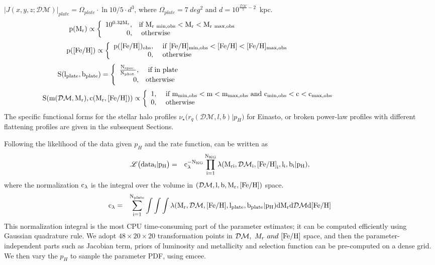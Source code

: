 \documentclass[12pt,preprint]{aastex}
\newcommand{\DM}{\mathcal{DM}}
\newcommand{\feh}{{\rm [Fe/H]}}
\newcommand{\lph}{\mathscr{L}\bigl({data_i}|p_H\bigr)}
\begin{document}
$ |J(x,y,z;\DM)|_{plate} = \Omega_{plate} \cdot \ln10 / 5 \cdot  d^3$,
 where $\Omega_{plate}=7~deg^2$ and $d=10^{\frac{\DM}{5}-2}$~kpc.
\begin{eqnarray}
\rm p(M_r) \propto \left\{ \begin{array}{rl}
\rm 10^{0.32M_r}, &\mbox{\rm if $\rm M_{r~min,obs}<M_r<M_{r~max,obs}$} ~~~~~~~~~~~~~~~~~~~~~~~~~~~~~~~~~~~~~~~~~~~~~~~~~~~~~~~\\
0, &\mbox{ \rm otherwise}~~~~~~~~~~~~~~~~~~~~~~~~~~~~~~~~~~~~~~~~~~~~~~~~~~~~~~~~~~~~~~~~~~~~~~~~~~~~~~~~~~~~
\end{array} \right.\nonumber
\end{eqnarray}
$$
\rm p(\feh) \propto \left\{ \begin{array}{rl}\rm p(\feh)_{obs}, &\mbox{ \rm if $\rm [Fe/H]_{min,obs}<\feh<[Fe/H]_{max,obs}$} ~~~~~~~~~~~~~~~~~~~~~~~~~~~~~~~~~~~\\
0, &\mbox{ \rm otherwise}~~~~~~~~~~~~~~~~~~~~~~~~~~~~~~~~
\end{array} \right.
$$
$$
\rm S(l_{plate},b_{plate})=\left\{ \begin{array}{rl}
\rm \frac{\rm N_{spec.}}{\rm N_{phot.}}, &\mbox{ \rm if in plate} ~~~~~~~~~~~~~~~~~~~~~~~~~~~~~~~~~~~~~~~~~~~~~~~~~~~~~~~~~~~~~~~~~~~~~~~~~~~~~\\
0, &\mbox{\rm otherwise}~~~~~~~~~~~~~~~~~~~~~~~~~~~~~~~~~~~~~~~~~~~~~~~~~~~~~~~~~~~~~~~~~~~~~~~~~~~~~~~~~~~~~~~
\end{array} \right.
$$
$$
\rm S(m(\DM,M_r),c(M_r,\feh))\propto \left\{ \begin{array}{rl}
1, &\mbox{ \rm if $\rm m_{min,obs}<m<m_{max,obs}$ and $\rm c_{min,obs}<c<c_{max,obs}$} ~~~~~~~~~~~~~~~~~~~~~~~~~~ \\
0, &\mbox{ otherwise}~~~~~~~~~~~~~~~~~~~~~~~~~~~~~~~~~~~~~~~~~~~~~~~~~~~~~
\end{array} \right.
$$
The specific functional forms for the stellar halo profiles $\nu_\star\bigl (r_q(\DM,l,b)|p_H\bigr )$
for Einasto, or broken power-law profiles with different flattening profiles are given in the subsequent Sections.

Following \citet{Bovy2012} the likelihood of the data given $p_H$ and the rate function, can be written as
\begin{eqnarray}
\rm \lph &=& \rm c_{\lambda}^{-N_{KG}}\prod \limits_{i=1}^{N_{KG}}\lambda(M_{ri},\DM_i,\feh_i,l_i,b_i|p_H),
\end{eqnarray}
where the normalization $\rm c_\lambda$ is the integral over the volume in $\rm (\DM,l,b,M_r,\feh)$ space.
\begin{eqnarray}
\rm c_\lambda&=&\rm \sum \limits_{i=1}^{N_{plate}} \int\int\int \lambda(M_r,\DM,\feh,l_{plate},b_{plate}|p_H)dM_rd \DM d \feh
\end{eqnarray}
This normalization integral is the most CPU time-consuming part of the parameter estimates; it can be computed efficiently using Gaussian quadrature rule. We adopt $48\times20\times20$ transformation points in $\DM, ~M_r ~and ~\feh$ space, and then the parameter-independent parts such as Jacobian term, priors of luminosity and metallicity and selection function can be pre-computed on a dense grid. We then vary the $p_H$ to sample the parameter PDF, using emcee\citep{Foreman2013}.
\end{document}
